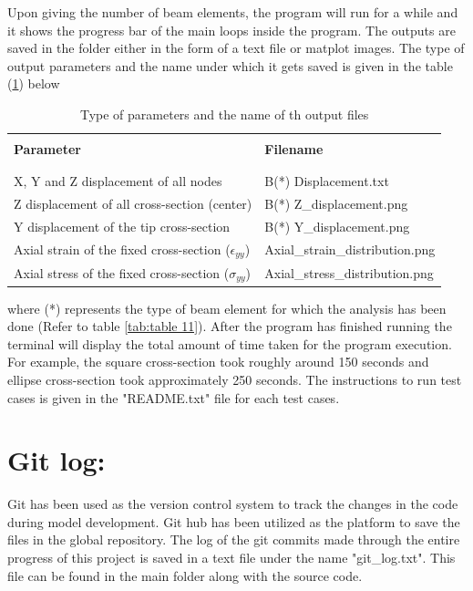 \documentclass[a4paper,12pt]{article}
\begin{document}
Upon giving the number of beam elements, the program will run for a while and it shows the progress bar of the main loops inside the program. The outputs are saved in the folder either in the form of a text file or matplot images. The type of output parameters and the name under which it gets saved is given in the table (\ref{tab:table 12}) below

\begin{table}[h!]
  \begin{center}
     \begin{tabular}{l  l}
      \hline\\
      \textbf{Parameter} & \textbf{Filename} \\
      \\
      \hline
      \\[-2pt]
       
       X, Y and Z displacement of all nodes               & B(*) Displacement.txt\\[5pt]
       Z displacement of all cross-section (center)       & B(*) Z\_displacement.png\\[5pt]
       Y displacement of the tip cross-section            & B(*) Y\_displacement.png\\[5pt]
       Axial strain of the fixed cross-section ($\epsilon_{yy}$)            & Axial\_strain\_distribution.png\\[5pt]
       Axial stress of the fixed cross-section ($\sigma_{yy}$)           & Axial\_stress\_distribution.png\\[5pt]      
      
      \hline
     \end{tabular}
    \caption{Type of parameters and the name of th output files}
    \label{tab:table 12}
  \end{center}
\end{table}
where (*) represents the type of beam element for which the analysis has been done (Refer to  table \ref{tab:table 11}). After the program has finished running the terminal will display the total amount of time taken for the program execution. For example, the square cross-section took roughly around 150 seconds and ellipse cross-section took approximately 250 seconds. The instructions to run test cases is given in the "README.txt" file for each test cases.

\newpage
\section*{Git log:}
\indent\indent\indent\indent Git has been used as the version control system to track the changes in the code during model development. Git hub has been utilized as the platform to save the files in the global repository. The log of the git commits made through the entire progress of this project is saved in a text file under the name "git\_log.txt". This file can be found in the main folder along with the source code.
\end{document}
